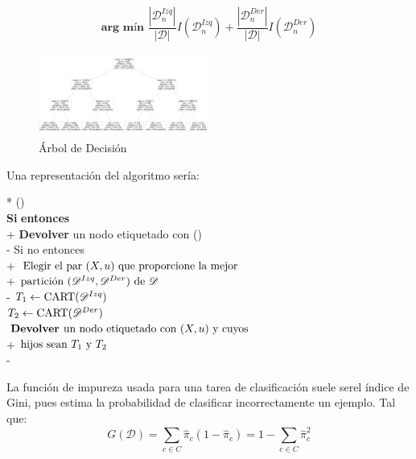 \documentclass[conference,a4paper]{IEEEtran}
\begin{document}
\begin{equation}
\textbf{arg mín  } \frac{|\mathscr{D}_{n}^{Izq}|}{|\mathscr{D}|}I(\mathscr{D}_{n}^{Izq})+ \frac{|\mathscr{D}_{n}^{Der}|}{|\mathscr{D}|}I(\mathscr{D}_{n}^{Der})
\end{equation}


\begin{figure} %
    \centering
    \includegraphics[width=0.5\textwidth]{./ImagenesMemoria/Arbol}
    \caption{\label{fig:arbolDecision}Árbol de Decisión}
\end{figure}

Una representación del algoritmo sería:

\begin{pseudo}*
    () \\
    \textbf{Si} \textnormal{} \textbf{entonces} \\+
    \textbf{Devolver} \textnormal{un nodo etiquetado con ()} \\-
    Si no entonces \\+
    \(\textnormal{Elegir el par $(X, u)$ que proporcione la mejor} \) \\+
    \(\textnormal{partición $(\mathscr{D}^{Izq},\mathscr{D}^{Der})$ de $\mathscr{D}$}\) \\-
    \( T_{1} \leftarrow \textnormal{CART($\mathscr{D}^{Izq}$)}\) \\
    \( T_{2} \leftarrow \textnormal{CART($\mathscr{D}^{Der}$)}\) \\
    \(\textbf{Devolver } \textnormal{un nodo etiquetado con ($X, u$) y cuyos}\)\\+
    \(\textnormal{hijos sean $T_{1}$  y $T_{2}$}\)\\-
 \end{pseudo}





 La función de impureza usada para una tarea de clasificación suele serel índice de Gini, pues estima la probabilidad de clasificar incorrectamente un ejemplo. Tal que: 
\begin{equation}
G(\mathscr{D}) = \sum_{c\in C} \hat{\pi}_c (1-  \hat{\pi}_c) = 1 -  \sum_{c\in C}  \hat{\pi}_c^2
\end{equation}
\end{document}
